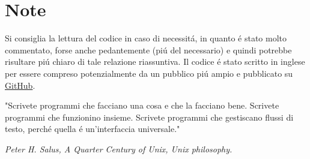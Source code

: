 
\chapter*{Note}
\label{ch:note}

Si consiglia la lettura del codice in caso di necessit\'a, in quanto \'e stato molto commentato, forse anche pedantemente (pi\'u del necessario) e quindi potrebbe risultare pi\'u chiaro di tale relazione riassuntiva. Il codice \'e stato scritto in inglese per essere compreso potenzialmente da un pubblico pi\'u ampio e pubblicato su \hyperlink{https://github.com/JuliusNixi/Boggle}{GitHub}.

\vspace*{5mm}

\epigraph{"Scrivete programmi che facciano una cosa e che la facciano bene. Scrivete programmi che funzionino insieme. Scrivete programmi che gestiscano flussi di testo, perch\'e quella \'e un'interfaccia universale."}{\textit{Peter H. Salus, A Quarter Century of Unix, Unix philosophy. }}


